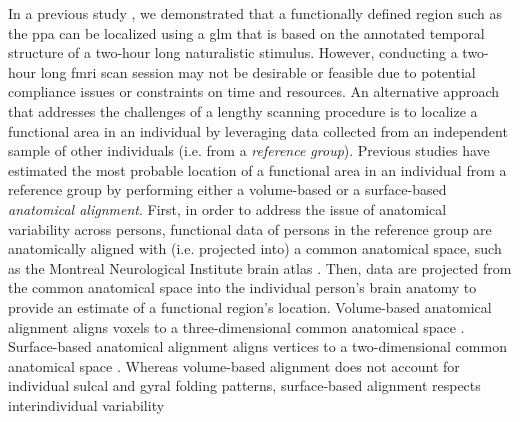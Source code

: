 In a previous study \citep{haeusler2022processing}, we demonstrated that a
functionally defined region such as the \ac{ppa} can be localized using  a
\acf{glm} that is based on the annotated temporal structure of a two-hour long
naturalistic stimulus.
However, conducting a two-hour long \ac{fmri} scan session may not be desirable
or feasible due to potential compliance issues or constraints on time and
resources.
An alternative approach that addresses the challenges of a lengthy scanning
procedure is to localize a functional area in an individual by leveraging data
collected from an independent sample of other individuals (i.e. from a
\textit{reference group}).
Previous studies have estimated the most probable location of a functional area
in an individual from a reference group by performing either a volume-based
\citep{zhen2017quantifying, zhen2015quantifying} or a surface-based
\citep{frost2012measuring, weiner2018defining, rosenke2021probabilistic,
wang2015probabilistic} \textit{anatomical alignment}.
%
First, in order to address the issue of anatomical variability across persons,
functional data of persons in the reference group are anatomically aligned with
(i.e. projected into) a common anatomical space, such as the Montreal
Neurological Institute brain atlas \citep[MNI152 atlas;][]{fonov2011unbiased}.
Then, data are projected from the common anatomical space into the individual
person's brain anatomy to provide an estimate of a functional region's location.
Volume-based anatomical alignment \citep[s.][for a review]{klein2009evaluation}
aligns voxels to a three-dimensional common anatomical space \citep[e.g., MNI152
atlas;][]{fonov2011unbiased}.
Surface-based anatomical alignment \citep{fischl1999cortical, yeo2009spherical}
aligns vertices to a two-dimensional common anatomical space \citep[e.g.,
FreeSurfer's fsaverage template;][]{fischl1999high}.
Whereas volume-based alignment does not account for individual sulcal and gyral
folding patterns, surface-based alignment respects interindividual variability
